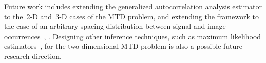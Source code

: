 \documentclass{article}
\begin{document}
Future work includes extending the generalized autocorrelation analysis estimator to the~\mbox{2-D} and~\mbox{3-D} cases of the MTD problem, and extending the framework to the case of an arbitrary spacing distribution between signal and image occurrences~\cite{lan2020multi}, \cite{kreymer2021two}. Designing other inference techniques, such as maximum likelihood estimators~\cite{lan2020multi}, for the two-dimensional MTD problem is also a possible future research direction.


\vfill



\end{document}
